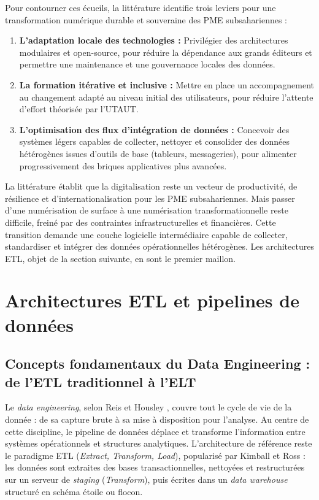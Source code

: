 Pour contourner ces écueils, la littérature identifie trois leviers pour une transformation numérique durable et souveraine des PME subsahariennes :
\begin{enumerate}
    \item \textbf{L'adaptation locale des technologies :} Privilégier des architectures modulaires et open-source, pour réduire la dépendance aux grands éditeurs et permettre une maintenance et une gouvernance locales des données.
    \item \textbf{La formation itérative et inclusive :} Mettre en place un accompagnement au changement adapté au niveau initial des utilisateurs, pour réduire l'attente d'effort théorisée par l'UTAUT.
    \item \textbf{L'optimisation des flux d'intégration de données :} Concevoir des systèmes légers capables de collecter, nettoyer et consolider des données hétérogènes issues d'outils de base (tableurs, messageries), pour alimenter progressivement des briques applicatives plus avancées.
\end{enumerate}

La littérature établit que la digitalisation reste un vecteur de productivité, de résilience et d'internationalisation pour les PME subsahariennes. Mais passer d'une numérisation de surface à une numérisation transformationnelle reste difficile, freiné par des contraintes infrastructurelles et financières. Cette transition demande une couche logicielle intermédiaire capable de collecter, standardiser et intégrer des données opérationnelles hétérogènes. Les architectures ETL, objet de la section suivante, en sont le premier maillon.

\section{Architectures ETL et pipelines de données}
\label{sec:Architectures_ETL_pipelines_donnees} 

\subsection{Concepts fondamentaux du Data Engineering : de l'ETL traditionnel à l'ELT}

Le \textit{data engineering}, selon Reis et Housley \cite{reisFundamentalsDataEngineering2022}, couvre tout le cycle de vie de la donnée : de sa capture brute à sa mise à disposition pour l'analyse. Au centre de cette discipline, le pipeline de données déplace et transforme l'information entre systèmes opérationnels et structures analytiques. L'architecture de référence reste le paradigme ETL (\textit{Extract, Transform, Load}), popularisé par Kimball et Ross \cite{kimballDataWarehouseToolkit2013} : les données sont extraites des bases transactionnelles, nettoyées et restructurées sur un serveur de \textit{staging} (\textit{Transform}), puis écrites dans un \textit{data warehouse} structuré en schéma étoile ou flocon. 

